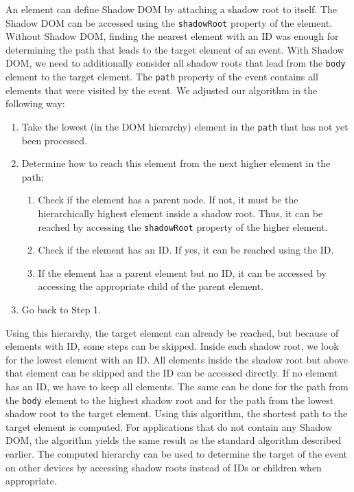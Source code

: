 An element can define Shadow DOM by attaching a shadow root to itself. The Shadow DOM can be accessed using the \lstinline|shadowRoot| property of the element. Without Shadow DOM, finding the nearest element with an ID was enough for determining the path that leads to the target element of an event. With Shadow DOM, we need to additionally consider all shadow roots that lead from the \lstinline|body| element to the target element. The \lstinline|path| property of the event contains all elements that were visited by the event. We adjusted our algorithm in the following way:
\begin{enumerate}
	\item Take the lowest (in the DOM hierarchy) element in the \lstinline|path| that has not yet been processed.
	\item Determine how to reach this element from the next higher element in the path:
	\begin{enumerate}
		\item Check if the element has a parent node. If not, it must be the hierarchically highest element inside a shadow root. Thus, it can be reached by accessing the \lstinline|shadowRoot| property of the higher element.
		\item Check if the element has an ID. If yes, it can be reached using the ID.
		\item If the element has a parent element but no ID, it can be accessed by accessing the appropriate child of the parent element.
	\end{enumerate}
	\item Go back to Step 1.
\end{enumerate}
Using this hierarchy, the target element can already be reached, but because of elements with ID, some steps can be skipped. Inside each shadow root, we look for the lowest element with an ID. All elements inside the shadow root but above that element can be skipped and the ID can be accessed directly. If no element has an ID, we have to keep all elements. The same can be done for the path from the \lstinline|body| element to the highest shadow root and for the path from the lowest shadow root to the target element. Using this algorithm, the shortest path to the target element is computed. For applications that do not contain any Shadow DOM, the algorithm yields the same result as the standard algorithm described earlier. The computed hierarchy can be used to determine the target of the event on other devices by accessing shadow roots instead of IDs or children when appropriate.

